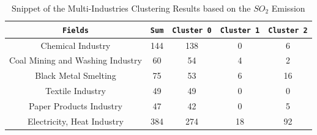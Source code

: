 \begin{table}[h]
    \centering
    \begin{tabular}{c|c|c|c|c}
        \texttt{Fields} & \texttt{Sum} & \texttt{Cluster 0} & \texttt{Cluster 1} & \texttt{Cluster 2} \\
        \hline
        Chemical Industry & 144 & 138 & 0 & 6 \\
        Coal Mining and Washing Industry & 60 & 54 & 4 & 2 \\
        Black Metal Smelting & 75 & 53 & 6 & 16 \\
        Textile Industry & 49 & 49 & 0 & 0 \\
        Paper Products Industry & 47 & 42 & 0 & 5 \\
        Electricity, Heat Industry & 384 & 274 & 18 & 92 \\
    \end{tabular}
    \caption{Snippet of the Multi-Industries Clustering Results based on the $SO_2$ Emission \cite{LIU-BDE}}
    \label{tab:multi_industries_clustering_results_based_on_the_so2_emission}
\end{table}




